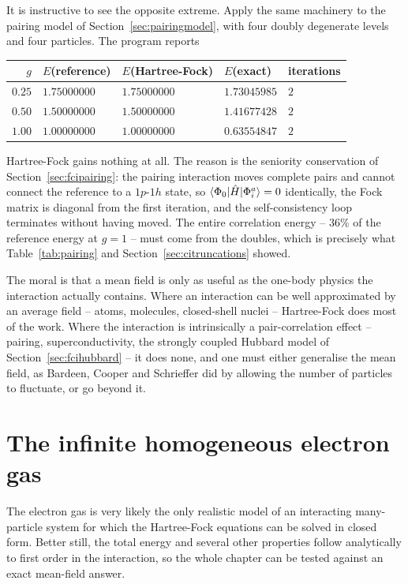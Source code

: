 It is instructive to see the opposite extreme.  Apply the same machinery to
the pairing model of Section~\ref{sec:pairingmodel}, with four doubly
degenerate levels and four particles.  The program reports

\begin{center}
\renewcommand{\arraystretch}{1.2}
\begin{tabular}{rllll}
\toprule
$g$ & $E$(reference) & $E$(Hartree-Fock) & $E$(exact) & iterations\\
\midrule
$0.25$ & $1.75000000$ & $1.75000000$ & $1.73045985$ & $2$\\
$0.50$ & $1.50000000$ & $1.50000000$ & $1.41677428$ & $2$\\
$1.00$ & $1.00000000$ & $1.00000000$ & $0.63554847$ & $2$\\
\bottomrule
\end{tabular}
\end{center}

Hartree-Fock gains nothing at all.  The reason is the seniority conservation
of Section~\ref{sec:fcipairing}: the pairing interaction moves complete pairs
and cannot connect the reference to a $1p$-$1h$ state, so
$\langle \Phi_0 | \hat{H} | \Phi_i^a \rangle=0$ identically, the Fock matrix is
diagonal from the first iteration, and the self-consistency loop terminates
without having moved.  The entire correlation energy -- $36\%$ of the
reference energy at $g=1$ -- must come from the doubles, which is precisely
what Table~\ref{tab:pairing} and Section~\ref{sec:citruncations} showed.

The moral is that a mean field is only as useful as the one-body physics the
interaction actually contains.  Where an interaction can be well approximated
by an average field -- atoms, molecules, closed-shell nuclei -- Hartree-Fock
does most of the work.  Where the interaction is intrinsically a
pair-correlation effect -- pairing, superconductivity, the strongly coupled
Hubbard model of Section~\ref{sec:fcihubbard} -- it does none, and one must
either generalise the mean field, as Bardeen, Cooper and Schrieffer did by
allowing the number of particles to fluctuate, or go beyond it.

\section{The infinite homogeneous electron gas}
\label{sec:electrongas}

The electron gas is very likely the only realistic model of an interacting
many-particle system for which the Hartree-Fock equations can be solved in
closed form.  Better still, the total energy and several other properties
follow analytically to first order in the interaction, so the whole chapter
can be tested against an exact mean-field answer.


